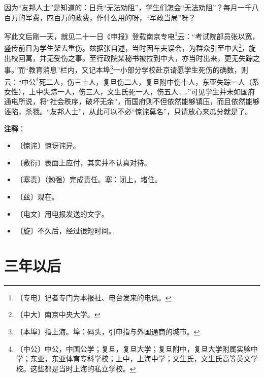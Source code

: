 \documentclass[12pt,UTF-8,openany]{ctexbook}
\begin{document}
\begin{normalsize}
    因为“友邦人士”是知道的：日兵“无法劝阻”，学生们怎会“无法劝阻”？每月一千八百万的军费，四百万的政费，作什么用的呀，“军政当局”呀？
    
    写此文后刚一天，就见二十一日《申报》登载南京专电\footnote{〔专电〕记者专门为本报社、电台发来的电讯。}云：“考试院部员张以宽，盛传前日为学生架去重伤。兹据张自述，当时因车夫误会，为群众引至中大\footnote{〔中大〕南京中央大学。}，旋出校回寓，并无受伤之事。至行政院某秘书被拉到中大，亦当时出来，更无失踪之事。”而“教育消息”栏内，又记本埠\footnote{〔本埠〕指上海。埠：码头，引申指与外国通商的城市。}一小部分学校赴京请愿学生死伤的确数，则云：“中公\footnote{〔中公〕中公，中国公学；复旦，复旦大学；复旦附中，复旦大学附属实验中学；东亚，东亚体育专科学校；上中，上海中学；文生氏，文生氏高等英文学校。这些都是当时上海的私立学校。}死二人，伤三十人，复旦伤二人，复旦附中伤十人，东亚失踪一人（系女性），上中失踪一人，伤三人，文生氏死一人，伤五人……”可见学生并未如国府通电所说，将“社会秩序，破坏无余”，而国府则不但依然能够镇压，而且依然能够诬陷，杀戮。“友邦人士”，从此可以不必“惊诧莫名”，只请放心来瓜分就是了。
    
\end{normalsize}


\newpage

\textbf{注释}：

\vspace{-1em}

\begin{itemize}
    \setlength\itemsep{-0.2em}
    \item 〔惊诧〕惊讶诧异。
    \item 〔敷衍〕表面上应付，其实并不认真对待。
    \item 〔塞责〕（勉强）完成责任。塞：闭上，堵住。
    \item 〔兹〕现在。
    \item 〔电文〕用电报发送的文字。
    \item 〔旋〕不久后，经过很短时间。
\end{itemize}

\chapter{三年以后}
\end{document}
